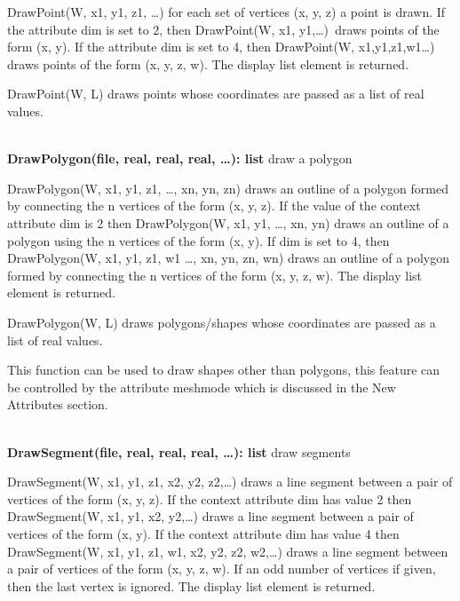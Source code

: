 \documentclass[letterpaper]{article}
\begin{document}
{\textsf{DrawPoint(W, x1, y1, z1, {\dots})} for each set of vertices
(x, y, z) a point is drawn. If the attribute \textsf{dim} is set to 2,
then \textsf{DrawPoint(W, x1, y1,{\dots})}\texttt{ }draws points of
the form (x, y). If the attribute \textsf{dim} is set to 4, then
\textsf{DrawPoint(W, x1,y1,z1,w1{\dots}) }draws points of the form (x,
y, z, w). The display list element is returned.


\bigskip

DrawPoint(W, L) draws points whose coordinates are passed as a list of
real values.

\noindent\hrulefill\\
\noindent\textsf{\textbf{DrawPolygon(file, real, real, real, {\dots}): list}}
\hfill draw a polygon


\bigskip

\textsf{DrawPolygon(W, x1, y1, z1, {\dots}, xn, yn, zn)} draws an
outline of a polygon formed by connecting the n vertices of the form
(x, y, z). If the value of the context attribute \textsf{dim} is 2
then \textsf{DrawPolygon(W, x1, y1, {\dots}, xn, yn)} draws an outline
of a polygon using the n vertices of the form (x, y). If
\textsf{dim} is set to 4, then \textsf{DrawPolygon(W, x1, y1, z1, w1
{\dots}, xn, yn, zn, wn)} draws an outline of a polygon formed by
connecting the n vertices of the form (x, y, z, w). The display list
element is returned.

DrawPolygon(W, L) draws polygons/shapes whose coordinates are passed
as a list of real values.


\bigskip

This function can be used to draw shapes other than polygons, this
feature can be controlled by the attribute \textsf{meshmode} which is
discussed in the New Attributes section.

\noindent\hrulefill\\
\noindent\textsf{\textbf{DrawSegment(file, real, real, real, {\dots}): list}}
\hfill draw segments


\bigskip

\textsf{DrawSegment(W, x1, y1, z1, x2, y2, z2,{\dots})} draws a line
segment between a pair of vertices of the form (x, y, z). If the
context attribute \textsf{dim} has value 2 then
\textsf{DrawSegment(W, x1, y1, x2, y2,{\dots})}
draws a line segment between a pair of
vertices of the form (x, y). If the context attribute \textsf{dim} has
value 4 then
\textsf{DrawSegment(W, x1, y1, z1, w1, x2, y2, z2, w2,{\dots})}
draws a line segment between a pair of vertices of the
form (x, y, z, w). If an odd number of vertices if given, then the
last vertex is ignored. The display list element is returned.


}
\end{document}

